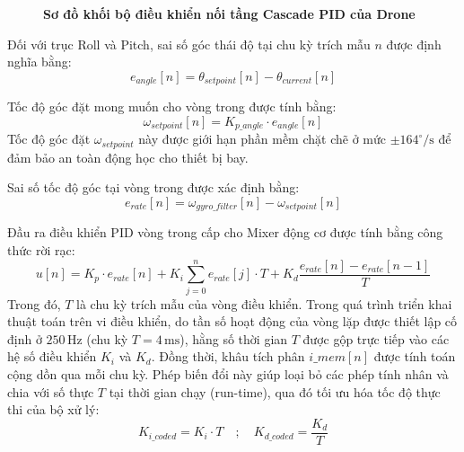 \begin{figure}[H]
{
    }
    \caption[Sơ đồ khối bộ điều khiển nối tầng Cascade PID của Drone]{\bfseries\fontsize{12pt}{0pt}\selectfont Sơ đồ khối bộ điều khiển nối tầng Cascade PID của Drone}
    \label{fig:so_do_khoi_pid}
\end{figure}

Đối với trục Roll và Pitch, sai số góc thái độ tại chu kỳ trích mẫu $n$ được định nghĩa bằng:
\begin{equation}
    e_{angle}[n] = \theta_{setpoint}[n] - \theta_{current}[n]
\end{equation}

Tốc độ góc đặt mong muốn cho vòng trong được tính bằng:
\begin{equation}
    \omega_{setpoint}[n] = K_{p\_angle} \cdot e_{angle}[n]
\end{equation}
Tốc độ góc đặt $\omega_{setpoint}$ này được giới hạn phần mềm chặt chẽ ở mức $\pm 164^\circ/\text{s}$ để đảm bảo an toàn động học cho thiết bị bay.

Sai số tốc độ góc tại vòng trong được xác định bằng:
\begin{equation}
    e_{rate}[n] = \omega_{gyro\_filter}[n] - \omega_{setpoint}[n]
\end{equation}

Đầu ra điều khiển PID vòng trong cấp cho Mixer động cơ được tính bằng công thức rời rạc:
\begin{equation}
    u[n] = K_p \cdot e_{rate}[n] + K_i \sum_{j=0}^n e_{rate}[j] \cdot T + K_d \frac{e_{rate}[n] - e_{rate}[n-1]}{T}
\end{equation}
Trong đó, $T$ là chu kỳ trích mẫu của vòng điều khiển. Trong quá trình triển khai thuật toán trên vi điều khiển, do tần số hoạt động của vòng lặp được thiết lập cố định ở $250\,\text{Hz}$ (chu kỳ $T = 4\,\text{ms}$), hằng số thời gian $T$ được gộp trực tiếp vào các hệ số điều khiển $K_i$ và $K_d$. Đồng thời, khâu tích phân $i\_mem[n]$ được tính toán cộng dồn qua mỗi chu kỳ. Phép biến đổi này giúp loại bỏ các phép tính nhân và chia với số thực $T$ tại thời gian chạy (run-time), qua đó tối ưu hóa tốc độ thực thi của bộ xử lý:
\begin{equation}
    K_{i\_coded} = K_i \cdot T \quad ; \quad K_{d\_coded} = \frac{K_d}{T}
\end{equation}

